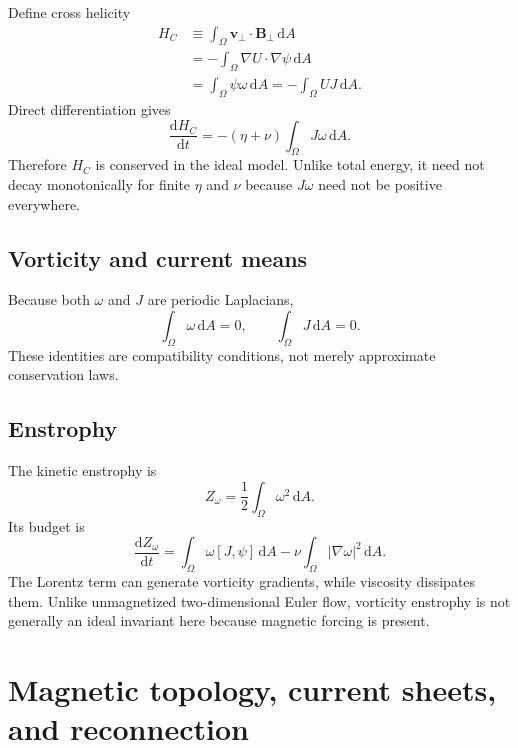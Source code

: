 \documentclass[11pt]{article}
\newcommand{\dd}{\mathrm{d}}
\newcommand{\vect}[1]{\bm{#1}}
\begin{document}
Define cross helicity
\begin{align}
H_C&\equiv\int_\Omega\vect{v}_\perp\cdot\vect{B}_\perp\,\dd A\\
&=-\int_\Omega\nabla U\cdot\nabla\psi\,\dd A\\
&=\int_\Omega\psi\omega\,\dd A
=-\int_\Omega UJ\,\dd A.
\end{align}
Direct differentiation gives
\begin{equation}
\frac{\dd H_C}{\dd t}
=-(\eta+\nu)\int_\Omega J\omega\,\dd A.
\label{eq:crosshelicity}
\end{equation}
Therefore $H_C$ is conserved in the ideal model. Unlike total energy, it need not decay monotonically for finite $\eta$ and $\nu$ because $J\omega$ need not be positive everywhere.

\subsection{Vorticity and current means}

Because both $\omega$ and $J$ are periodic Laplacians,
\begin{equation}
\int_\Omega\omega\,\dd A=0,
\qquad
\int_\Omega J\,\dd A=0.
\end{equation}
These identities are compatibility conditions, not merely approximate conservation laws.

\subsection{Enstrophy}

The kinetic enstrophy is
\begin{equation}
Z_\omega=\frac{1}{2}\int_\Omega\omega^2\,\dd A.
\end{equation}
Its budget is
\begin{equation}
\frac{\dd Z_\omega}{\dd t}
=\int_\Omega\omega[J,\psi]\,\dd A
-\nu\int_\Omega|\nabla\omega|^2\,\dd A.
\end{equation}
The Lorentz term can generate vorticity gradients, while viscosity dissipates them. Unlike unmagnetized two-dimensional Euler flow, vorticity enstrophy is not generally an ideal invariant here because magnetic forcing is present.

\section{Magnetic topology, current sheets, and reconnection}
\label{sec:reconnection}
\end{document}
